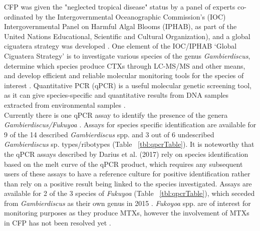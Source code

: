 \documentclass[10pt,letterpaper]{article}
\begin{document}
CFP was given the "neglected tropical disease" status by a panel of experts co-ordinated by the Intergovernmental Oceanographic Commission’s (IOC) Intergovernmental Panel on Harmful Algal Blooms (IPHAB), as part of the United Nations Educational, Scientific and Cultural Organization), and a global ciguatera strategy was developed \citep{globalcig}. 
One element of the IOC/IPHAB ‘Global Ciguatera Strategy’ is to  investigate various species of the genus \emph{Gambierdiscus}, determine which species produce CTXs through LC-MS/MS and other means, and develop efficient and reliable molecular monitoring tools for the species of interest \citep{globalcig}. 
Quantitative PCR (qPCR) is a useful molecular genetic screening tool, as it can give species-specific and quantitative results from DNA samples extracted from environmental samples \citep{globalcig}. \\
\FloatBarrier
Currently there is one qPCR assay to identify the presence of the genera \emph{Gambierdiscus/Fukuyoa} \citep{smith2017molecular}. 
Assays for species specific identification are available for 9 of the 14 described \emph{Gambierdiscus} spp. and 3 out of 6 undescribed \emph{Gambierdiscus} sp. types/ribotypes (Table ~\ref{tbl:qpcrTable}). 
It is noteworthy that the qPCR assays described by Darius et al. (2017) rely on species identification based on the melt curve of the qPCR product, which requires any subsequent users of these assays to have a reference culture for positive identification rather than rely on a positive result being linked to the species investigated. 
Assays are available for 2 of the 3 species of \emph{Fukuyoa} (Table ~\ref{tbl:qpcrTable}), which seceded from \emph{Gambierdiscus} as their own genus in 2015 \citep{gomez2015fukuyoa}. 
\textit{Fukoyoa} spp. are of interest for monitoring purposes as they produce MTXs, however the involvement of MTXs in CFP has not been resolved yet \citep{kohli2014feeding}.
\end{document}
